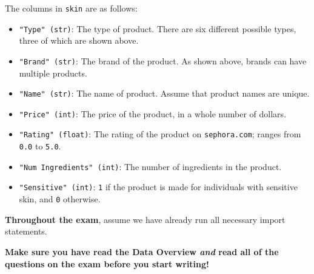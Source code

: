 \documentclass[twoside,12pt]{article}
\begin{document}
\vspace{.1in}

\noindent The columns in \texttt{skin} are as follows:

\begin{itemize}

\item{\texttt{"Type" (str)}: The type of product. There are six different possible types, three of which are shown above.}
\item{\texttt{"Brand" (str)}: The brand of the product. As shown above, brands can have multiple products.}
\item{\texttt{"Name" (str)}: The name of product. Assume that product names are unique.}
\item{\texttt{"Price" (int)}: The price of the product, in a whole number of dollars.}
\item{\texttt{"Rating" (float)}: The rating of the product on \texttt{sephora.com}; ranges from \texttt{0.0} to \texttt{5.0}.}
\item{\texttt{"Num Ingredients" (int)}: The number of ingredients in the product.}
\item{\texttt{"Sensitive" (int)}: \texttt{1} if the product is made for individuals with sensitive skin, and \texttt{0} otherwise.}

\end{itemize}


\noindent \textbf{Throughout the exam}, assume we have already run all necessary import statements.

\newpage

\noindent \textbf{Make sure you have read the Data Overview \textit{and} read all of the questions on the exam before you start writing!}
\end{document}
